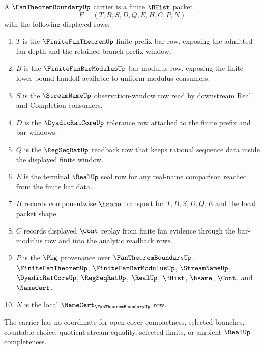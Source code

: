 \begin{definition}
\label{def:fan-theorem-boundary-carrier}
A $\FanTheoremBoundaryUp$ carrier is a finite $\BHist$ packet
$$
F=(T,B,S,D,Q,E,H,C,P,N)
$$
with the following displayed rows:
\begin{enumerate}
\item $T$ is the $\FiniteFanTheoremUp$ finite prefix-bar row, exposing the admitted fan depth and the retained branch-prefix window.
\item $B$ is the $\FiniteFanBarModulusUp$ bar-modulus row, exposing the finite lower-bound handoff available to uniform-modulus consumers.
\item $S$ is the $\StreamNameUp$ observation-window row read by downstream Real and Completion consumers.
\item $D$ is the $\DyadicRatCoreUp$ tolerance row attached to the finite prefix and bar windows.
\item $Q$ is the $\RegSeqRatUp$ readback row that keeps rational sequence data inside the displayed finite window.
\item $E$ is the terminal $\RealUp$ seal row for any real-name comparison reached from the finite bar data.
\item $H$ records componentwise $\hsame$ transport for $T,B,S,D,Q,E$ and the local packet shape.
\item $C$ records displayed $\Cont$ replay from finite fan evidence through the bar-modulus row and into the analytic readback rows.
\item $P$ is the $\Pkg$ provenance over $\FanTheoremBoundaryUp$, $\FiniteFanTheoremUp$, $\FiniteFanBarModulusUp$, $\StreamNameUp$, $\DyadicRatCoreUp$, $\RegSeqRatUp$, $\RealUp$, $\BHist$, $\hsame$, $\Cont$, and $\NameCert$.
\item $N$ is the local $\NameCert_{\FanTheoremBoundaryUp}$ row.
\end{enumerate}
The carrier has no coordinate for open-cover compactness, selected branches, countable choice, quotient stream equality, selected limits, or ambient $\RealUp$ completeness.
\end{definition}

